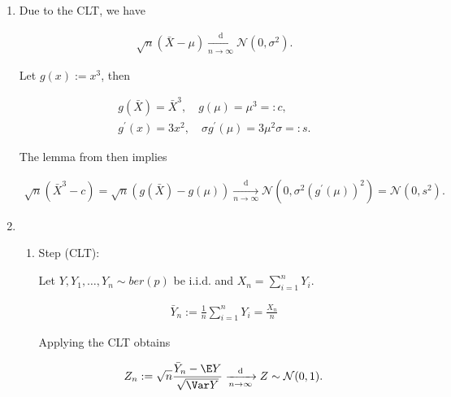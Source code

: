 \begin{solution}

\phantom{}

\begin{enumerate}[label = (\alph*)]

    \item Due to the CLT, we have \cite[Lecture 4, Slide 59]{EStat}
    
    \begin{align*}
        \sqrt n (\bar X - \mu) \xrightarrow[n \to \infty]{\mathrm d} \mathcal N(0, \sigma^2).
    \end{align*}

    Let $g(x) := x^3$, then

    \begin{gather*}
        g(\bar X) = \bar X ^3, \quad g(\mu) = \mu^3 =: c, \\
        g^\prime(x) = 3 x^2, \quad \sigma g^\prime(\mu) = 3 \mu^2 \sigma =: s.
    \end{gather*}

    The lemma from \cite*[Lecture 5, Slide 10]{EStat} then implies

    \begin{align*}
        \sqrt n (\bar X^3 - c)
        =
        \sqrt n (g(\bar X) - g(\mu))
        \xrightarrow[n \to \infty]{\mathrm d}
        \mathcal N(0, \sigma^2 (g^\prime(\mu))^2)
        =
        \mathcal N(0, s^2).
    \end{align*}

    \item

    \begin{enumerate}[label = \arabic*.]

        \item Step (CLT):
        
        Let $Y, Y_1, \dots, Y_n \sim \mathit{ber}(p)$ be i.i.d. and $X_n = \sum_{i=1}^n Y_i$.

        \begin{align*}
            \bar Y_n := \frac{1}{n} \sum_{i=1}^n Y_i = \frac{X_n}{n}
        \end{align*}

        Applying the CLT obtains

        \begin{align*}
            Z_n
            :=
            \sqrt n \frac{\bar Y_n - \E Y}{\sqrt{\Var Y}}
            \xrightarrow[n \to \infty]{\mathrm d}
            Z
            \sim
            \mathcal N(0, 1).
        \end{align*}


\end{enumerate}
\end{enumerate}
\end{solution}
